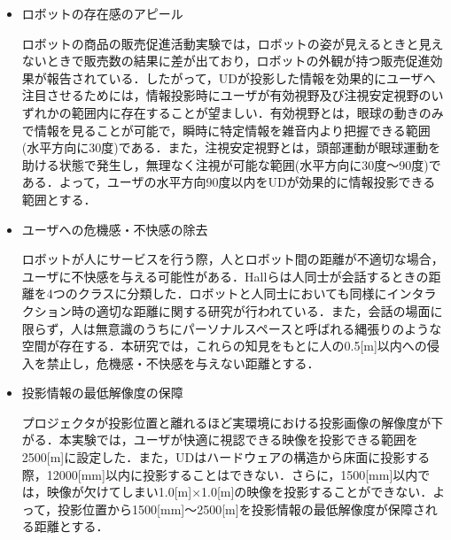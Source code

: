 \documentclass[12pt]{sonota/aislab}
\begin{document}
\begin{itemize}
 \item ロボットの存在感のアピール
    
    ロボットの商品の販売促進活動実験\cite{販売促進}では，ロボットの姿が見えるときと見えないときで販売数の結果に差が出ており，ロボットの外観が持つ販売促進効果が報告されている．したがって，UDが投影した情報を効果的にユーザへ注目させるためには，情報投影時にユーザが有効視野及び注視安定視野のいずれかの範囲内に存在することが望ましい．有効視野とは，眼球の動きのみで情報を見ることが可能で，瞬時に特定情報を雑音内より把握できる範囲(水平方向に30度)である．また，注視安定視野とは，頭部運動が眼球運動を助ける状態で発生し，無理なく注視が可能な範囲(水平方向に30度〜90度)である．よって，ユーザの水平方向90度以内をUDが効果的に情報投影できる範囲とする．
    
 \item ユーザへの危機感・不快感の除去
 
    ロボットが人にサービスを行う際，人とロボット間の距離が不適切な場合，ユーザに不快感を与える可能性がある．Hallらは人同士が会話するときの距離を4つのクラスに分類した\cite{Hall}．ロボットと人同士においても同様にインタラクション時の適切な距離に関する研究が行われている\cite{proximity}．また，会話の場面に限らず，人は無意識のうちにパーソナルスペースと呼ばれる縄張りのような空間が存在する．本研究では，これらの知見をもとに人の0.5[m]以内への侵入を禁止し，危機感・不快感を与えない距離とする．
 
 \item 投影情報の最低解像度の保障
 
    プロジェクタが投影位置と離れるほど実環境における投影画像の解像度が下がる．本実験では，ユーザが快適に視認できる映像を投影できる範囲を2500[m]に設定した．また，UDはハードウェアの構造から床面に投影する際，12000[mm]以内に投影することはできない．さらに，1500[mm]以内では，映像が欠けてしまい1.0[m]×1.0[m]の映像を投影することができない．よって，投影位置から1500[mm]〜2500[m]を投影情報の最低解像度が保障される距離とする．
\end{itemize}
\end{document}
